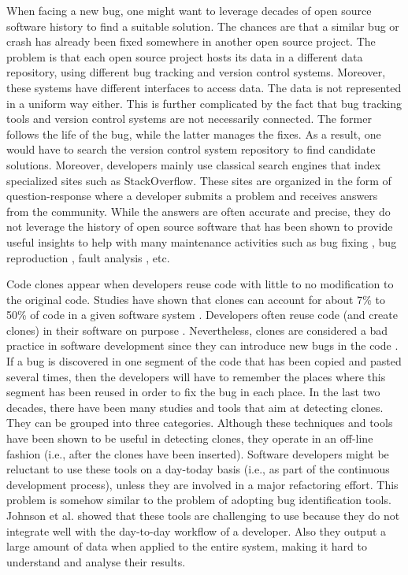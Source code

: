 When facing a new bug, one might want to leverage decades of open source software history to find a suitable solution.
The chances are that a similar bug or crash has already been fixed somewhere  in  another  open  source  project.
The  problem  is that each open source project hosts its data in a different data repository,  using  different  bug  tracking  and  version  control systems.
Moreover,  these  systems  have  different  interfaces to  access  data.
The  data  is  not  represented  in  a  uniform way  either.
This  is  further  complicated  by  the  fact  that  bug tracking tools and version control systems are not necessarily connected.
The  former  follows  the  life  of  the  bug,  while  the latter  manages  the  fixes.
As  a  result,  one  would  have  to search the version control system repository to find candidate solutions.
Moreover,  developers  mainly  use  classical  search  engines that  index  specialized  sites  such  as  StackOverflow.
These sites  are  organized  in  the  form  of  question-response  where a developer submits a problem and receives answers from the community.
While the answers are often accurate and precise, they do not leverage the history of open source software that has been shown to provide useful insights to help with many maintenance activities such as bug fixing \cite{Saha2014}, bug reproduction \cite{Nayrolles2015}, fault analysis \cite{Nessa2008}, etc.

Code clones appear when developers reuse code with little to no modification to the original code.
Studies have shown that clones can account for about 7\% to 50\% of code in a given software system \cite{Baker, StephaneDucasse}.
Developers often reuse code (and
create clones) in their software on purpose \cite{Kim2005}.
Nevertheless, clones are considered a bad practice in software development since they can introduce new bugs in the code \cite{Kapser2006,Juergens2009,Li2006}.
If a bug is discovered in one segment of the code that has been copied and pasted several times, then the developers will have to remember the places where this segment has been reused in order to fix the bug in each place.
In the last two decades, there have been many studies and tools that aim at detecting clones.
They can be grouped into three categories.
Although these techniques and tools have been shown to
be useful in detecting clones, they operate in an off-line fashion (i.e., after the clones have been inserted).
Software developers might be reluctant to use these tools on a day-today basis (i.e., as part of the continuous development process), unless they are involved in a major refactoring effort.
This problem is somehow similar to the problem of adopting bug identification tools. Johnson et al. \cite{Johnson2013} showed that these tools are challenging to use because they do not integrate well with the day-to-day workflow of a developer.
Also they output a large amount of data when applied to the entire system, making it hard to understand and analyse their results.


